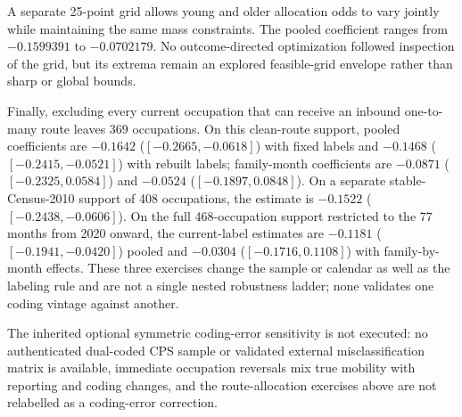 A separate 25-point grid allows young and older allocation odds to vary jointly
while maintaining the same mass constraints.  The pooled coefficient ranges
from $-0.1599391$ to $-0.0702179$.  No outcome-directed optimization followed
inspection of the grid, but its extrema remain an explored feasible-grid
envelope rather than sharp or global bounds.

Finally, excluding every current occupation that can receive an inbound
one-to-many route leaves 369 occupations.  On this clean-route support, pooled
coefficients are $-0.1642$ ($[-0.2665,-0.0618]$) with fixed labels and
$-0.1468$ ($[-0.2415,-0.0521]$) with rebuilt labels; family-month
coefficients are $-0.0871$ ($[-0.2325,0.0584]$) and $-0.0524$
($[-0.1897,0.0848]$).  On a separate stable-Census-2010 support of 408
occupations, the estimate is $-0.1522$ ($[-0.2438,-0.0606]$).  On the full
468-occupation support restricted to the 77 months from 2020 onward, the
current-label estimates are $-0.1181$ ($[-0.1941,-0.0420]$) pooled and
$-0.0304$ ($[-0.1716,0.1108]$) with family-by-month effects.  These three
exercises change the sample or calendar as well as the labeling rule and are
not a single nested robustness ladder; none validates one coding vintage
against another.

The inherited optional symmetric coding-error sensitivity is not executed:
no authenticated dual-coded CPS sample or validated external misclassification
matrix is available, immediate occupation reversals mix true mobility with
reporting and coding changes, and the route-allocation exercises above are not
relabelled as a coding-error correction.
